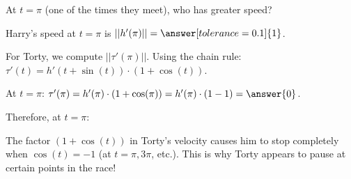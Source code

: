 \documentclass{ximera}
\begin{document}
\begin{problem}
    At $t=\pi$ (one of the times they meet), who has greater speed?
    
    Harry's speed at $t=\pi$ is $||h'(\pi)||=\answer[tolerance=0.1]{1}$.
    
    For Torty, we compute $||\tau'(\pi)||$. Using the chain rule: $\tau'(t)=h'(t+\sin(t))\cdot(1+\cos(t))$.
    
    At $t=\pi$: $\tau'(\pi)=h'(\pi)\cdot(1+\cos(\pi))=h'(\pi)\cdot(1-1)=\answer{0}$.
    
    Therefore, at $t=\pi$:
    \begin{multipleChoice}
    \end{multipleChoice}
    
    \begin{feedback}
        The factor $(1+\cos(t))$ in Torty's velocity causes him to stop completely when $\cos(t)=-1$ (at $t=\pi, 3\pi$, etc.). This is why Torty appears to pause at certain points in the race!
    \end{feedback}
\end{problem}
\end{document}
